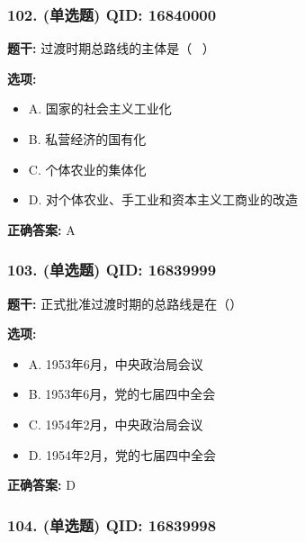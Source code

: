 \documentclass[12pt,UTF8]{ctexart}
\begin{document}
\subsubsection*{102. (单选题) \small QID: 16840000}

\textbf{题干:}
过渡时期总路线的主体是（  ）

\textbf{选项:}
\begin{itemize}[leftmargin=*]

  \item A. 国家的社会主义工业化

  \item B. 私营经济的国有化

  \item C. 个体农业的集体化

  \item D. 对个体农业、手工业和资本主义工商业的改造

\end{itemize}

\textbf{正确答案:}
A

\vspace{0.3em}\hrulefill\vspace{0.7em}

\subsubsection*{103. (单选题) \small QID: 16839999}

\textbf{题干:}
正式批准过渡时期的总路线是在（）

\textbf{选项:}
\begin{itemize}[leftmargin=*]

  \item A. 1953年6月，中央政治局会议

  \item B. 1953年6月，党的七届四中全会

  \item C. 1954年2月，中央政治局会议

  \item D. 1954年2月，党的七届四中全会

\end{itemize}

\textbf{正确答案:}
D

\vspace{0.3em}\hrulefill\vspace{0.7em}

\subsubsection*{104. (单选题) \small QID: 16839998}
\end{document}
